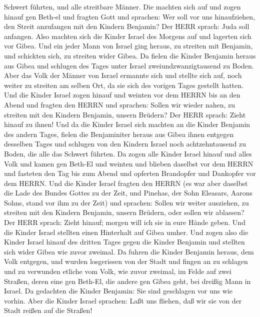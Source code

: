 Schwert führten, und alle streitbare Männer.  Die machten
sich auf und zogen hinauf gen Beth-el und fragten Gott und sprachen: Wer
soll vor uns hinaufziehen, den Streit anzufangen mit den Kindern
Benjamin? Der HERR sprach: Juda soll anfangen.  Also
machten sich die Kinder Israel des Morgens auf und lagerten sich vor
Gibea.  Und ein jeder Mann von Israel ging heraus, zu
streiten mit Benjamin, und schickten sich, zu streiten wider Gibea.
 Da fielen die Kinder Benjamin heraus aus Gibea und
schlugen des Tages unter Israel zweiundzwanzigtausend zu Boden.
 Aber das Volk der Männer von Israel ermannte sich und
stellte sich auf, noch weiter zu streiten am selben Ort, da sie sich des
vorigen Tages gestellt hatten.  Und die Kinder Israel zogen
hinauf und weinten vor dem HERRN bis an den Abend und fragten den HERRN
und sprachen: Sollen wir wieder nahen, zu streiten mit den Kindern
Benjamin, unsern Brüdern? Der HERR sprach: Zieht hinauf zu ihnen!
 Und da die Kinder Israel sich machten an die Kinder
Benjamin des andern Tages,  fielen die Benjaminiter heraus
aus Gibea ihnen entgegen desselben Tages und schlugen von den Kindern
Israel noch achtzehntausend zu Boden, die alle das Schwert führten.
 Da zogen alle Kinder Israel hinauf und alles Volk und
kamen gen Beth-El und weinten und blieben daselbst vor dem HERRN und
fasteten den Tag bis zum Abend und opferten Brandopfer und Dankopfer vor
dem HERRN.  Und die Kinder Israel fragten den HERRN (es war
aber daselbst die Lade des Bundes Gottes zu der Zeit,  und
Pinehas, der Sohn Eleasars, Aarons Sohns, stand vor ihm zu der Zeit) und
sprachen: Sollen wir weiter ausziehen, zu streiten mit den Kindern
Benjamin, unsern Brüdern, oder sollen wir ablassen? Der HERR sprach:
Zieht hinauf; morgen will ich sie in eure Hände geben.  Und
die Kinder Israel stellten einen Hinterhalt auf Gibea umher.
 Und zogen also die Kinder Israel hinauf des dritten Tages
gegen die Kinder Benjamin und stellten sich wider Gibea wie zuvor
zweimal.  Da fuhren die Kinder Benjamin heraus, dem Volk
entgegen, und wurden losgerissen von der Stadt und fingen an zu schlagen
und zu verwunden etliche vom Volk, wie zuvor zweimal, im Felde auf zwei
Straßen, deren eine gen Beth-El, die andere gen Gibea geht, bei dreißig
Mann in Israel.  Da gedachten die Kinder Benjamin: Sie sind
geschlagen vor uns wie vorhin. Aber die Kinder Israel sprachen: Laßt uns
fliehen, daß wir sie von der Stadt reißen auf die Straßen! 
